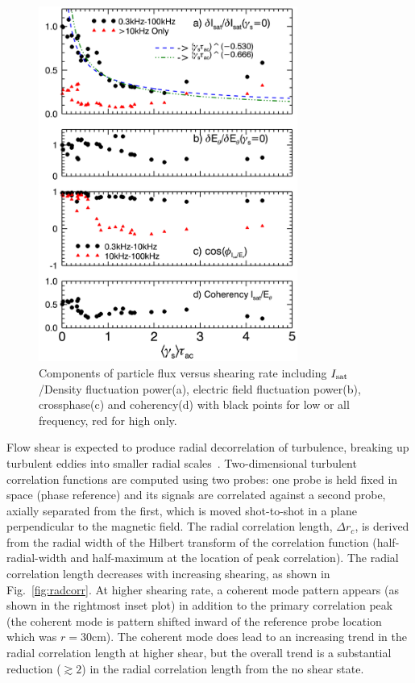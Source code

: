 \documentclass[aps,prl,amsmath,amssymb,preprint,superscriptaddress]{revtex4}
\begin{document}
\begin{figure}[!htbp]
\centerline{
\includegraphics[width=8.5cm]{fluxcomps}}
\caption{\label{fig:fluxcomps} Components of particle flux versus shearing rate including $I_{\rm sat}$/Density fluctuation power(a), electric field fluctuation power(b), crossphase(c) and coherency(d) with black points for low or all frequency, red for high only.}
\end{figure}

Flow shear is expected to produce radial decorrelation of turbulence,
breaking up turbulent eddies into smaller radial scales~\cite{biglari90}.
Two-dimensional turbulent correlation functions are computed using
two probes: one probe is held fixed in space (phase reference) and
its signals are correlated against a second probe, axially separated
from the first, which is moved shot-to-shot in a plane perpendicular
to the magnetic field.  The radial correlation length, $\Delta r_c$,
is derived from the radial width of the Hilbert transform of the
correlation function (half-radial-width and half-maximum at the
location of peak correlation).  The radial correlation length 
decreases with increasing shearing, as shown in
Fig.~\ref{fig:radcorr}.  At higher shearing rate, a coherent mode
pattern appears (as shown in the rightmost inset plot) in addition to
the primary correlation peak (the coherent mode is
pattern shifted inward of the reference probe location which was $r=30$cm).  The coherent
mode does lead to an increasing trend in the radial correlation length
at higher shear, but the overall trend is a substantial reduction
($\gtrsim 2$) in the radial correlation length from the no shear state.
\end{document}
